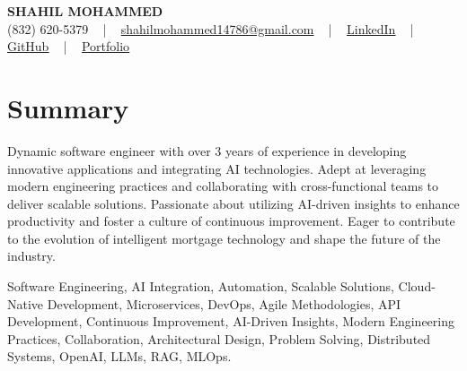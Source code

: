 \documentclass[letterpaper,10pt]{article}
\begin{document}
\begin{center}
    {\fontsize{14pt}{12pt}\selectfont \textbf{\MakeUppercase{Shahil Mohammed}}}\\ \vspace{2pt}
    \fontsize{10pt}{12pt}\selectfont (832) 620-5379 ~ | ~ \href{mailto:shahilmohammed14786@gmail.com}{shahilmohammed14786@gmail.com} ~ | ~  
    \href{https://www.linkedin.com/in/shahil-mohammed-9652931a1/}{\color{blue}\underline{LinkedIn}}  ~ | ~ 
    \href{https://github.com/freakbeast14}{\color{blue}\underline{GitHub}} ~ | ~ 
    \href{https://shahil-mohammed.netlify.app/}{\color{blue}\underline{Portfolio}}
    \vspace{-8pt}
\end{center}

\section{Summary}
\vspace{-2pt}\fontsize{8pt}{9pt}\selectfont
Dynamic software engineer with over 3 years of experience in developing innovative applications and integrating AI technologies. Adept at leveraging modern engineering practices and collaborating with cross-functional teams to deliver scalable solutions. Passionate about utilizing AI-driven insights to enhance productivity and foster a culture of continuous improvement. Eager to contribute to the evolution of intelligent mortgage technology and shape the future of the industry.
 \vspace{-5pt}
 
{\fontsize{1pt}{1pt}\selectfont\color{white}
Software Engineering, AI Integration, Automation, Scalable Solutions, Cloud-Native Development, Microservices, DevOps, Agile Methodologies, API Development, Continuous Improvement, AI-Driven Insights, Modern Engineering Practices, Collaboration, Architectural Design, Problem Solving, Distributed Systems, OpenAI, LLMs, RAG, MLOps.
}
\vspace{-8pt}

\vspace{-2pt}
\end{document}
